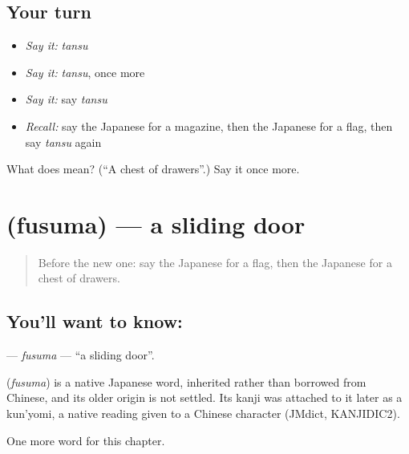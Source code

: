 \subsection*{Your turn}
\begin{itemize}
\raggedright
  \item \emph{Say it:} \emph{tansu}
  \item \emph{Say it:} \emph{tansu}, once more
  \item \emph{Say it:} say \emph{tansu}
  \item \emph{Recall:} say the Japanese for a magazine, then the Japanese for a flag, then say \emph{tansu} again
\end{itemize}

\begin{tcolorbox}[breakable,colback=teal!4,colframe=teal!35!black,title={Before you move on}]
What does  mean? (\textquotedblleft{}A chest of drawers\textquotedblright{}.) Say it once more.
\end{tcolorbox}
\section[\texorpdfstring{\ja{ふすま} (fusuma)}{ふすま (fusuma)}]{ (fusuma) — a sliding door}

\label{lesson:JA-C101-fusuma}



\begin{quote}
Before the new one: say the Japanese for a flag, then the Japanese for a chest of drawers.
\end{quote}

\subsection*{You'll want to know: }
\textbf{} — \emph{fusuma} — \textquotedblleft{}a sliding door\textquotedblright{}.

\begin{cousinweb}
\textbf{} (\emph{fusuma}) is a native Japanese word, inherited rather than borrowed from Chinese, and its older origin is not settled. Its kanji was attached to it later as a kun'yomi, a native reading given to a Chinese character (JMdict, KANJIDIC2).
\end{cousinweb}

\begin{grammarlens}[title={What you've built}]
One more word for this chapter.
\end{grammarlens}

